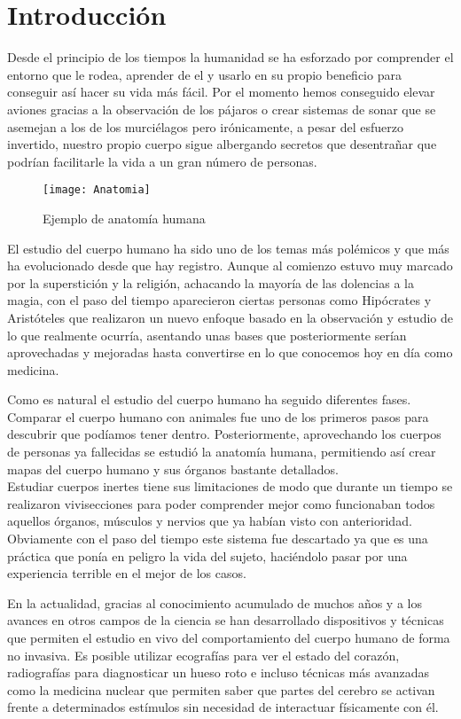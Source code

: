 \chapter{Introducción\label{sec:introduccion}}

Desde el principio de los tiempos la humanidad se ha esforzado por comprender el entorno que le rodea, aprender de el y usarlo en su propio beneficio para conseguir así hacer su vida más fácil. Por el momento hemos conseguido elevar aviones gracias a la observación de los pájaros o crear sistemas de sonar que se asemejan a los de los murciélagos pero irónicamente, a pesar del esfuerzo invertido, nuestro propio cuerpo sigue albergando secretos que desentrañar que podrían facilitarle la vida a un gran número de personas.
\begin{wrapfigure}{r}{0.25\textwidth} %
    \centering
    \texttt{[image: Anatomia]}
    \caption{Ejemplo de anatomía humana}
\end{wrapfigure}

El estudio del cuerpo humano ha sido uno de los temas más polémicos y que más ha evolucionado desde que hay registro. Aunque al comienzo estuvo muy marcado por la superstición y la religión, achacando la mayoría de las dolencias a la magia, con el paso del tiempo aparecieron ciertas personas como Hipócrates y Aristóteles que realizaron un nuevo enfoque basado en la observación y estudio de lo que realmente ocurría, asentando unas bases que posteriormente serían aprovechadas y mejoradas hasta convertirse en lo que conocemos hoy en día como medicina.

Como es natural el estudio del cuerpo humano ha seguido diferentes fases. Comparar el cuerpo humano con animales fue uno de los primeros pasos para descubrir que podíamos tener dentro. Posteriormente, aprovechando los cuerpos de personas ya fallecidas se estudió la anatomía humana, permitiendo así crear mapas del cuerpo humano y sus órganos bastante detallados.
\\Estudiar cuerpos inertes tiene sus limitaciones de modo que durante un tiempo se realizaron vivisecciones para poder comprender mejor como funcionaban todos aquellos órganos, músculos y nervios que ya habían visto con anterioridad. Obviamente con el paso del tiempo este sistema fue descartado ya que es una práctica que ponía en peligro la vida del sujeto, haciéndolo pasar por una experiencia terrible en el mejor de los casos.

En la actualidad, gracias al conocimiento acumulado de muchos años y a los avances en otros campos de la ciencia se han desarrollado dispositivos y técnicas que permiten el estudio en vivo del comportamiento del cuerpo humano de forma no invasiva. Es posible utilizar ecografías para ver el estado del corazón, radiografías para diagnosticar un hueso roto e incluso técnicas más avanzadas como la medicina nuclear que permiten saber que partes del cerebro se activan frente a determinados estímulos sin necesidad de interactuar físicamente con él.

